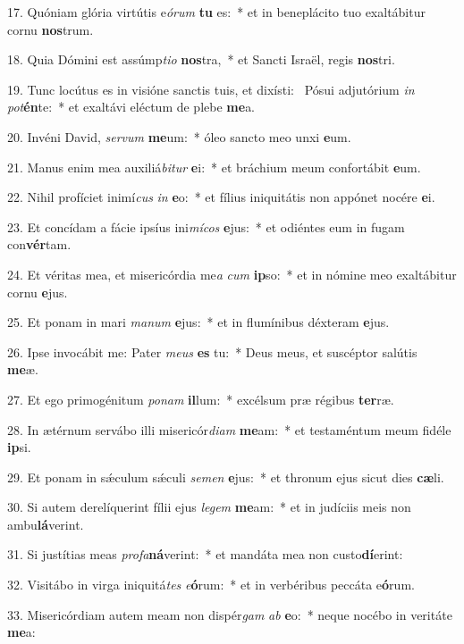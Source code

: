 17. Quóniam glória virtútis e\textit{ó}\textit{rum} \textbf{tu} es:~*  et in beneplácito tuo exaltábitur cornu \textbf{nos}trum.\

18. Quia Dómini est assúmp\textit{ti}\textit{o} \textbf{nos}tra,~*  et Sancti Israël, regis \textbf{nos}tri.\

19. Tunc locútus es in visióne sanctis tuis, et dixísti: \dag\  Pósui adjutórium \textit{in} \textit{pot}\textbf{én}te:~*  et exaltávi eléctum de plebe \textbf{me}a.\

20. Invéni David, \textit{ser}\textit{vum} \textbf{me}um:~*  óleo sancto meo unxi \textbf{e}um.\

21. Manus enim mea auxiliá\textit{bi}\textit{tur} \textbf{e}i:~*  et bráchium meum confortábit \textbf{e}um.\

22. Nihil profíciet inimí\textit{cus} \textit{in} \textbf{e}o:~*  et fílius iniquitátis non appónet nocére \textbf{e}i.\

23. Et concídam a fácie ipsíus ini\textit{mí}\textit{cos} \textbf{e}jus:~*  et odiéntes eum in fugam con\textbf{vér}tam.\

24. Et véritas mea, et misericórdia me\textit{a} \textit{cum} \textbf{ip}so:~*  et in nómine meo exaltábitur cornu \textbf{e}jus.\

25. Et ponam in mari \textit{ma}\textit{num} \textbf{e}jus:~*  et in flumínibus déxteram \textbf{e}jus.\

26. Ipse invocábit me: Pater \textit{me}\textit{us} \textbf{es} tu:~*  Deus meus, et suscéptor salútis \textbf{me}æ.\

27. Et ego primogénitum \textit{po}\textit{nam} \textbf{il}lum:~*  excélsum præ régibus \textbf{ter}ræ.\

28. In ætérnum servábo illi misericór\textit{di}\textit{am} \textbf{me}am:~*  et testaméntum meum fidéle \textbf{ip}si.\

29. Et ponam in sǽculum sǽculi \textit{se}\textit{men} \textbf{e}jus:~*  et thronum ejus sicut dies \textbf{cæ}li.\

30. Si autem derelíquerint fílii ejus \textit{le}\textit{gem} \textbf{me}am:~*  et in judíciis meis non ambu\textbf{lá}verint.\

31. Si justítias meas \textit{pro}\textit{fa}\textbf{ná}verint:~*  et mandáta mea non custo\textbf{dí}erint:\

32. Visitábo in virga iniquitá\textit{tes} \textit{e}\textbf{ó}rum:~*  et in verbéribus peccáta e\textbf{ó}rum.\

33. Misericórdiam autem meam non dispér\textit{gam} \textit{ab} \textbf{e}o:~*  neque nocébo in veritáte \textbf{me}a:\

